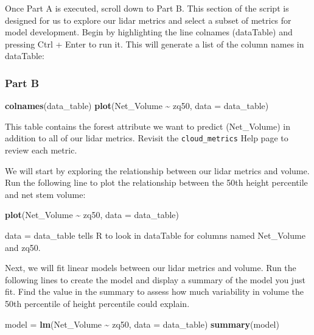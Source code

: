 \documentclass[
]{book}
\newenvironment{Shaded}{\begin{snugshade}}{\end{snugshade}}
\newcommand{\AttributeTok}[1]{\textcolor[rgb]{0.13,0.29,0.53}{#1}}
\newcommand{\FunctionTok}[1]{\textcolor[rgb]{0.13,0.29,0.53}{\textbf{#1}}}
\newcommand{\NormalTok}[1]{#1}
\newcommand{\OtherTok}[1]{\textcolor[rgb]{0.56,0.35,0.01}{#1}}
\newcommand{\SpecialCharTok}[1]{\textcolor[rgb]{0.81,0.36,0.00}{\textbf{#1}}}
\begin{document}
Once Part A is executed, scroll down to Part B. This section of the script is designed for us to explore our lidar metrics and select a subset of metrics for model development. Begin by highlighting the line colnames (dataTable) and pressing Ctrl + Enter to run it. This will generate a list of the column names in dataTable:

\hypertarget{part-b}{%
\subsubsection*{Part B}\label{part-b}}

\begin{Shaded}
\begin{Highlighting}[]
\FunctionTok{colnames}\NormalTok{(data\_table)}
\FunctionTok{plot}\NormalTok{(Net\_Volume }\SpecialCharTok{\textasciitilde{}}\NormalTok{ zq50, }\AttributeTok{data =}\NormalTok{ data\_table)}
\end{Highlighting}
\end{Shaded}

This table contains the forest attribute we want to predict (Net\_Volume) in addition to all of our lidar metrics. Revisit the \texttt{cloud\_metrics} Help page to review each metric.

We will start by exploring the relationship between our lidar metrics and volume. Run the following line to plot the relationship between the 50th height percentile and net stem volume:

\begin{Shaded}
\begin{Highlighting}[]
\FunctionTok{plot}\NormalTok{(Net\_Volume }\SpecialCharTok{\textasciitilde{}}\NormalTok{ zq50, }\AttributeTok{data =}\NormalTok{ data\_table)}
\end{Highlighting}
\end{Shaded}

data = data\_table tells R to look in dataTable for columns named Net\_Volume and zq50.

Next, we will fit linear models between our lidar metrics and volume. Run the following lines to create the model and display a summary of the model you just fit. Find the value in the summary to assess how much variability in volume the 50th percentile of height percentile could explain.

\begin{Shaded}
\begin{Highlighting}[]
\NormalTok{model }\OtherTok{=} \FunctionTok{lm}\NormalTok{(Net\_Volume }\SpecialCharTok{\textasciitilde{}}\NormalTok{ zq50, }\AttributeTok{data =}\NormalTok{ data\_table)}
\FunctionTok{summary}\NormalTok{(model)}
\end{Highlighting}
\end{Shaded}
\end{document}
